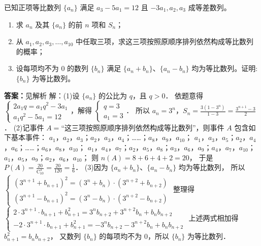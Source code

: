 \begin{problem}
已知正项等比数列 $\{a_n\}$ 满足 $a_3 - 5a_1 = 12$ 且 $-3a_1, a_2, a_3$ 成等差数列。

\begin{enumerate}
\item 求 $a_n$ 及其 $\{a_n\}$ 的前 $n$ 项和 $S_n$；
\item 从 $a_1, a_2, a_3, \dots, a_{10}$ 中任取三项，求这三项按照原顺序排列依然构成等比数列的概率；
\item 设每项均不为 0 的数列 $\{b_n\}$ 满足 $\{a_n + b_n\}$、$\{a_n - b_n\}$ 均为等比数列。证明: $\{b_n\}$ 为等比数列。
\end{enumerate}
\begin{solution}
\textbf{答案：}见解析
解：(1)设 $\{a_{n}\}$ 的公比为 $q$，且 $q>0$．
依题意得 $\begin{cases}2a_{1}q=a_{1}q^{2}-3a_{1}\\ a_{1}q^{2}-5a_{1}=12\end{cases}$，解得 $\begin{cases}q=3\\ a_{1}=3\end{cases}$．
所以 $a_{n}=3^{n}$，$S_{n}=\frac{3(1-3^{n})}{1-3}=\frac{3^{n+1}-3}{2}$．
(2)记事件 $A=$“这三项按照原顺序排列依然构成等比数列”，则事件 $A$ 包含如下基本事件：
$a_{1}$，$a_{2}$，$a_{3}$；$a_{2}$，$a_{3}$，$a_{4}$；……；$a_{8}$，$a_{9}$，$a_{10}$；
$a_{1}$，$a_{3}$，$a_{5}$；$a_{2}$，$a_{4}$，$a_{6}$；……；$a_{6}$，$a_{8}$，$a_{10}$；
$a_{1}$，$a_{4}$，$a_{7}$；$a_{2}$，$a_{5}$，$a_{8}$；$a_{3}$，$a_{6}$，$a_{9}$；$a_{4}$，$a_{7}$，$a_{10}$；
$a_{1}$，$a_{5}$，$a_{9}$；$a_{2}$，$a_{6}$，$a_{10}$；
则 $n(A)=8+6+4+2=20$，
于是 $P(A)=\frac{20}{\mathrm{C}_{10}^{3}}=\frac{20}{120}=\frac{1}{6}$．
(3)因为 $\{a_{n}+b_{n}\}$、$\{a_{n}-b_{n}\}$ 均为等比数列，
所以 $\begin{cases}(3^{n+1}+b_{n+1})^{2}=(3^{n}+b_{n})\cdot(3^{n+2}+b_{n+2})\\ (3^{n+1}-b_{n+1})^{2}=(3^{n}-b_{n})\cdot(3^{n+2}-b_{n+2})\end{cases}$
整理得 $\begin{cases}2\cdot 3^{n+1}\cdot b_{n+1}+b_{n+1}^{2}=3^{n}b_{n+2}+3^{n+2}b_{n}+b_{n}b_{n+2}\\ -2\cdot 3^{n+1}\cdot b_{n+1}+b_{n+1}^{2}=-3^{n}b_{n+2}-3^{n+2}b_{n}+b_{n}b_{n+2}\end{cases}$
上述两式相加得 $b_{n+1}^{2}=b_{n}b_{n+2}$，
又数列 $\{b_{n}\}$ 的每项均不为 0，所以 $\{b_{n}\}$ 为等比数列．
\end{solution}
\end{problem}
